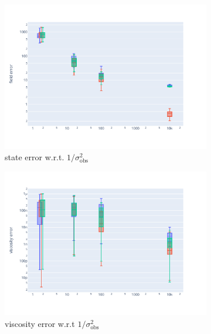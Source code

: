 \begin{figure}[htbp]
	\begin{subfigure}{0.45\textwidth}
		\captionsetup{labelformat=empty}
		\centering
		\includegraphics[width=\linewidth]{./images/app2d/MSE_obs_precision_box.pdf}
		\caption{state error w.r.t. $1/\sigma_{\text{obs}}^2$}
	\end{subfigure}
	\hfill
	\begin{subfigure}{0.45\textwidth}
		\captionsetup{labelformat=empty}
		\centering
		\includegraphics[width=\linewidth]{./images/app2d/MSE_visc_obs_precision_box.pdf}
		\caption{viscosity error w.r.t $1/\sigma_{\text{obs}}^2$}
		\label{fig:obs_precision}
	\end{subfigure}
	\begin{subfigure}{0.45\textwidth}
		\centering

\end{subfigure}
\end{figure}
